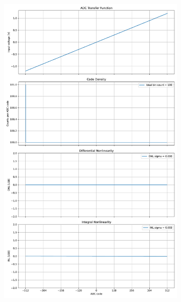 \documentclass[varwidth]{standalone}
\begin{document}
\begin{figure}
\begin{subfigure}{0.32\textwidth}
    \includegraphics[width=\textwidth]{behavioral_10b_ideal_nonlinearity.pdf}
\end{subfigure}
\begin{subfigure}{0.32\textwidth}

\end{subfigure}
\end{figure}
\end{document}
